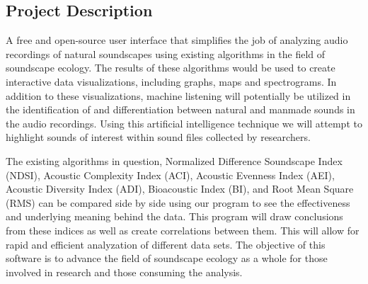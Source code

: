 \subsection{Project Description}
A free and open-source user interface that simplifies the job of analyzing audio recordings of natural soundscapes using existing algorithms in the field of soundscape ecology. The results of these algorithms would be used to create interactive data visualizations, including graphs, maps and spectrograms. In addition to these visualizations, machine listening will potentially be utilized in the identification of and differentiation between natural and manmade sounds in the audio recordings. Using this artificial intelligence technique we will attempt to highlight sounds of interest within sound files collected by researchers.\par
The existing algorithms in question, Normalized Difference Soundscape Index (NDSI), Acoustic Complexity Index (ACI), Acoustic Evenness Index (AEI), Acoustic Diversity Index (ADI), Bioacoustic Index (BI), and Root Mean Square (RMS) can be compared side by side using our program to see the effectiveness and underlying meaning behind the data. This program will draw conclusions from these indices as well as create correlations between them. This will allow for rapid and efficient analyzation of  different data sets. The objective of this software is to advance the field of soundscape ecology as a whole for those involved in research and those consuming the analysis.\par